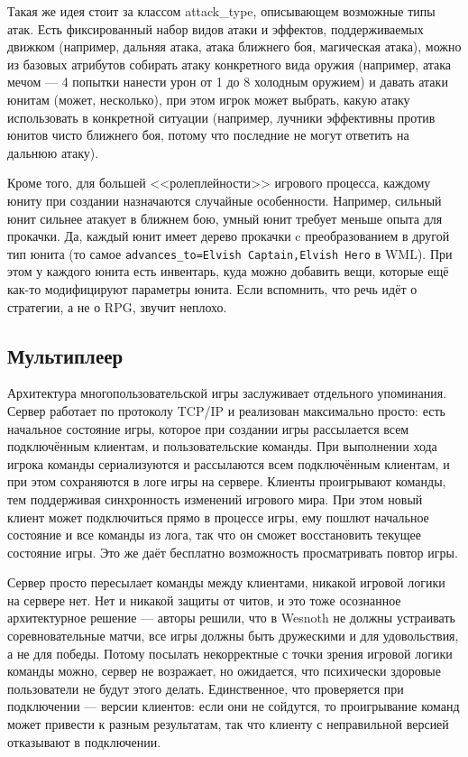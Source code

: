 \documentclass[a5paper]{article}
\begin{document}
Такая же идея стоит за классом attack\_type, описывающем возможные типы атак. Есть фиксированный набор видов атаки и эффектов, поддерживаемых движком (например, дальняя атака, атака ближнего боя, магическая атака), можно из базовых атрибутов собирать атаку конкретного вида оружия (например, атака мечом --- 4 попытки нанести урон от 1 до 8 холодным оружием) и давать атаки юнитам (может, несколько), при этом игрок может выбрать, какую атаку использовать в конкретной ситуации (например, лучники эффективны против юнитов чисто ближнего боя, потому что последние не могут ответить на дальнюю атаку).

Кроме того, для большей <<ролеплейности>> игрового процесса, каждому юниту при создании назначаются случайные особенности. Например, сильный юнит сильнее атакует в ближнем бою, умный юнит требует меньше опыта для прокачки. Да, каждый юнит имеет дерево прокачки c преобразованием в другой тип юнита (то самое \texttt{advances_to=Elvish Captain,Elvish Hero} в WML). При этом у каждого юнита есть инвентарь, куда можно добавить вещи, которые ещё как-то модифицируют параметры юнита. Если вспомнить, что речь идёт о стратегии, а не о RPG, звучит неплохо.

\subsection{Мультиплеер}

Архитектура многопользовательской игры заслуживает отдельного упоминания. Сервер работает по протоколу TCP/IP и реализован максимально просто: есть начальное состояние игры, которое при создании игры рассылается всем подключённым клиентам, и пользовательские команды. При выполнении хода игрока команды сериализуются и рассылаются всем подключённым клиентам, и при этом сохраняются в логе игры на сервере. Клиенты проигрывают команды, тем поддерживая синхронность изменений игрового мира. При этом новый клиент может подключиться прямо в процессе игры, ему пошлют начальное состояние и все команды из лога, так что он сможет восстановить текущее состояние игры. Это же даёт бесплатно возможность просматривать повтор игры.

Сервер просто пересылает команды между клиентами, никакой игровой логики на сервере нет. Нет и никакой защиты от читов, и это тоже осознанное архитектурное решение --- авторы решили, что в Wesnoth не должны устраивать соревновательные матчи, все игры должны быть дружескими и для удовольствия, а не для победы. Потому посылать некорректные с точки зрения игровой логики команды можно, сервер не возражает, но ожидается, что психически здоровые пользователи не будут этого делать. Единственное, что проверяется при подключении --- версии клиентов: если они не сойдутся, то проигрывание команд может привести к разным результатам, так что клиенту с неправильной версией отказывают в подключении.
\end{document}
